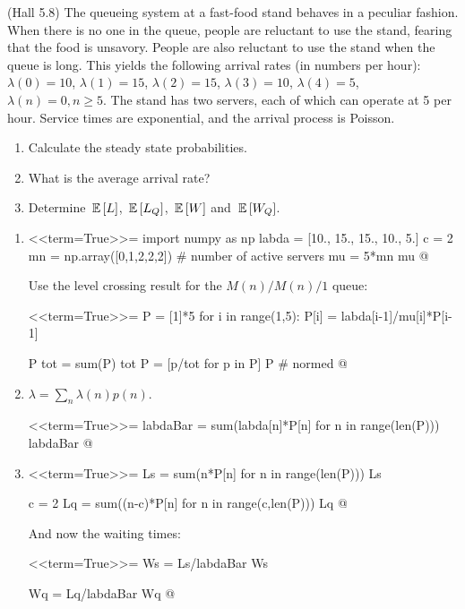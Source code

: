 \begin{question}
  (Hall 5.8) The queueing system at a fast-food stand behaves in a
  peculiar fashion. When there is no one in the queue, people are
  reluctant to use the stand, fearing that the food is
  unsavory. People are also reluctant to use the stand when the queue
  is long. This yields the following arrival rates (in numbers per hour): $\lambda(0) = 10$, $\lambda(1)=15$, $\lambda(2)=15$, $\lambda(3)=10$, $\lambda(4)=5$, $\lambda(n)=0, n\geq 5$. The stand has two servers, each of which can operate at 5 per hour. Service times are exponential, and the arrival process is Poisson.
  \begin{enumerate}
  \item Calculate the steady state probabilities.
  \item What is the average arrival rate?
  \item Determine $\,\mathbb{E}\left[L\right]$, $\,\mathbb{E}\left[L_Q\right]$, $\,\mathbb{E}\left[W\right]$ and $\,\mathbb{E}\left[W_Q\right]$.
  \end{enumerate}
  \begin{solution}
      \begin{enumerate}
      \item 

<<term=True>>=
import numpy as np
labda = [10., 15., 15., 10., 5.]
c = 2
mn = np.array([0,1,2,2,2]) # number of active servers
mu = 5*mn
mu
@

Use the level crossing result for the $M(n)/M(n)/1$ queue:

<<term=True>>=
P = [1]*5
for i in range(1,5):
    P[i] = labda[i-1]/mu[i]*P[i-1]

P
tot = sum(P)
tot
P = [p/tot for p in P]
P # normed
@ 

\item 

$\lambda = \sum_{n}\lambda(n) p(n)$.

<<term=True>>=
labdaBar = sum(labda[n]*P[n] for n in range(len(P)))
labdaBar
@



\item 
<<term=True>>=
Ls = sum(n*P[n] for n in range(len(P)))
Ls

c = 2
Lq = sum((n-c)*P[n] for n in range(c,len(P)))
Lq
@ 

And now the waiting times:

<<term=True>>=
Ws = Ls/labdaBar
Ws

Wq = Lq/labdaBar
Wq
@ 

  \end{enumerate}
    \end{solution}
\end{question}

